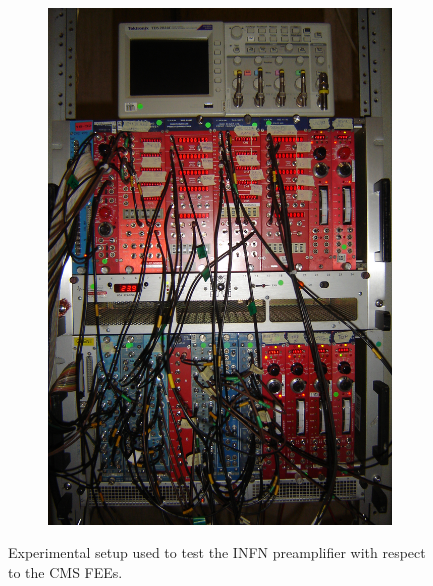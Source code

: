 \begin{figure}[H]
\begin{subfigure}{0.5\linewidth}
			\caption{\label{fig:Setup-GIF:B}}
		\end{subfigure}
		\begin{subfigure}{0.5\linewidth}
		    \centering
			\includegraphics[width = 0.9\linewidth]{fig/chapt6/Pulse-processing-GIF.JPG}
			\caption{\label{fig:Setup-GIF:C}}
		\end{subfigure}
		\caption{\label{fig:Setup-GIF} Experimental setup used to test the INFN preamplifier with respect to the CMS FEEs.}
    \end{figure}
	 
